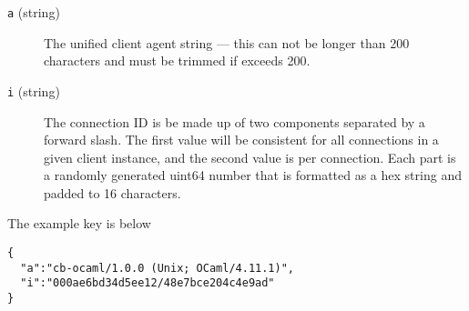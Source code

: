 \documentclass{report}
\begin{document}
\begin{description}
    \item [\texttt{a} (string)]
        The unified client agent string --- this can not be longer than 200 characters and must be trimmed if exceeds
        200.
    \item [\texttt{i} (string)]
        The connection ID is be made up of two components separated by a forward slash. The first value will be
        consistent for all connections in a given client instance, and the second value is per connection. Each part is
        a randomly generated uint64 number that is formatted as a hex string and padded to 16 characters.
\end{description}

The example key is below

\begin{verbatim}
{
  "a":"cb-ocaml/1.0.0 (Unix; OCaml/4.11.1)",
  "i":"000ae6bd34d5ee12/48e7bce204c4e9ad"
}
\end{verbatim}
\end{document}
